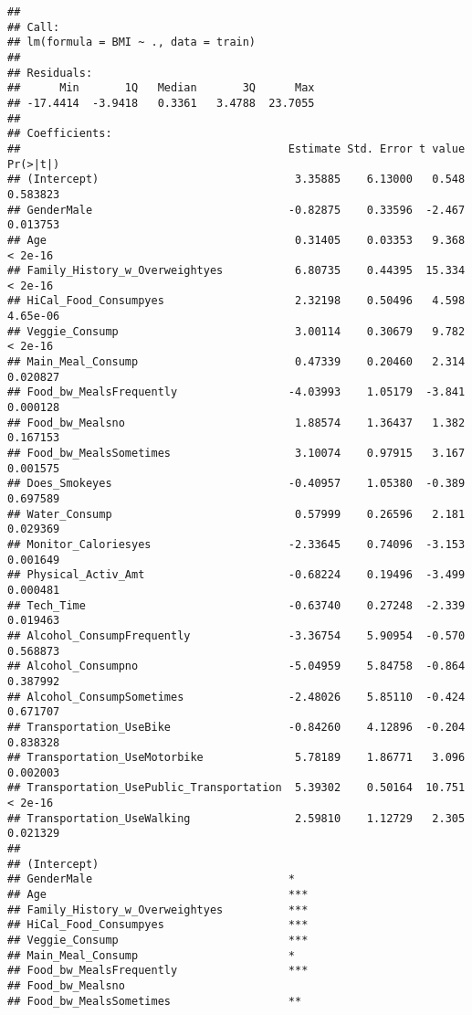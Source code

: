 \documentclass[
]{article}
\begin{document}
\begin{verbatim}
## 
## Call:
## lm(formula = BMI ~ ., data = train)
## 
## Residuals:
##      Min       1Q   Median       3Q      Max 
## -17.4414  -3.9418   0.3361   3.4788  23.7055 
## 
## Coefficients:
##                                         Estimate Std. Error t value Pr(>|t|)
## (Intercept)                              3.35885    6.13000   0.548 0.583823
## GenderMale                              -0.82875    0.33596  -2.467 0.013753
## Age                                      0.31405    0.03353   9.368  < 2e-16
## Family_History_w_Overweightyes           6.80735    0.44395  15.334  < 2e-16
## HiCal_Food_Consumpyes                    2.32198    0.50496   4.598 4.65e-06
## Veggie_Consump                           3.00114    0.30679   9.782  < 2e-16
## Main_Meal_Consump                        0.47339    0.20460   2.314 0.020827
## Food_bw_MealsFrequently                 -4.03993    1.05179  -3.841 0.000128
## Food_bw_Mealsno                          1.88574    1.36437   1.382 0.167153
## Food_bw_MealsSometimes                   3.10074    0.97915   3.167 0.001575
## Does_Smokeyes                           -0.40957    1.05380  -0.389 0.697589
## Water_Consump                            0.57999    0.26596   2.181 0.029369
## Monitor_Caloriesyes                     -2.33645    0.74096  -3.153 0.001649
## Physical_Activ_Amt                      -0.68224    0.19496  -3.499 0.000481
## Tech_Time                               -0.63740    0.27248  -2.339 0.019463
## Alcohol_ConsumpFrequently               -3.36754    5.90954  -0.570 0.568873
## Alcohol_Consumpno                       -5.04959    5.84758  -0.864 0.387992
## Alcohol_ConsumpSometimes                -2.48026    5.85110  -0.424 0.671707
## Transportation_UseBike                  -0.84260    4.12896  -0.204 0.838328
## Transportation_UseMotorbike              5.78189    1.86771   3.096 0.002003
## Transportation_UsePublic_Transportation  5.39302    0.50164  10.751  < 2e-16
## Transportation_UseWalking                2.59810    1.12729   2.305 0.021329
##                                            
## (Intercept)                                
## GenderMale                              *  
## Age                                     ***
## Family_History_w_Overweightyes          ***
## HiCal_Food_Consumpyes                   ***
## Veggie_Consump                          ***
## Main_Meal_Consump                       *  
## Food_bw_MealsFrequently                 ***
## Food_bw_Mealsno                            
## Food_bw_MealsSometimes                  ** 

\end{verbatim}
\end{document}

